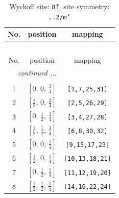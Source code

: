 \documentclass[fleqn,8pt]{jsarticle}
\begin{document}
\begin{longtable}{ccc}
\caption{Wyckoff site: {\tt 8f}, site symmetry: {\tt ..2/m'}}
 \\
 \hline \hline
No. & position & mapping \\ \hline \endfirsthead

\multicolumn{2}{l}{\tablename\ \thetable{}} \\
 \hline \hline
No. & position & mapping \\ \hline \endhead

 \hline \hline
\multicolumn{2}{r}{\footnotesize\it continued ...} \\ \endfoot

 \hline \hline
\multicolumn{2}{r}{} \\ \endlastfoot

1 & $\left[ 0,\, 0,\, \frac{3}{4} \right]$ & {\tt [1,7,25,31]} \\ \hline
2 & $\left[ \frac{1}{2},\, 0,\, \frac{3}{4} \right]$ & {\tt [2,5,26,29]} \\ \hline
3 & $\left[ 0,\, \frac{1}{2},\, \frac{3}{4} \right]$ & {\tt [3,4,27,28]} \\ \hline
4 & $\left[ \frac{1}{2},\, \frac{1}{2},\, \frac{3}{4} \right]$ & {\tt [6,8,30,32]} \\ \hline
5 & $\left[ 0,\, 0,\, \frac{1}{4} \right]$ & {\tt [9,15,17,23]} \\ \hline
6 & $\left[ \frac{1}{2},\, 0,\, \frac{1}{4} \right]$ & {\tt [10,13,18,21]} \\ \hline
7 & $\left[ 0,\, \frac{1}{2},\, \frac{1}{4} \right]$ & {\tt [11,12,19,20]} \\ \hline
8 & $\left[ \frac{1}{2},\, \frac{1}{2},\, \frac{1}{4} \right]$ & {\tt [14,16,22,24]} \\
\end{longtable}
\renewcommand{\arraystretch}{1.2}
\end{document}
